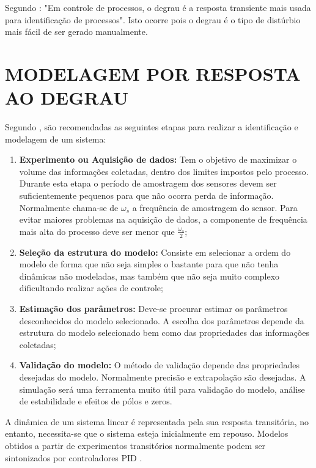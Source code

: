 \documentclass[12pt,oneside,a4paper, chapter=TITLE, section = TITLE, english, brazil]{abntex2}
\begin{document}
Segundo : "Em controle de processos, o degrau  é a resposta transiente mais usada para identificação de processos". Isto ocorre pois o degrau é o tipo de distúrbio mais fácil de ser gerado manualmente.

\section{MODELAGEM POR RESPOSTA AO DEGRAU} \label{sec:mod_degrau} %

Segundo , são recomendadas as seguintes etapas para realizar a identificação e modelagem de um sistema:

\begin{enumerate}

\item \textbf{Experimento ou Aquisição de dados:} Tem o objetivo de maximizar o volume das informações coletadas, dentro dos limites impostos pelo processo. Durante esta etapa o período de amostragem dos sensores devem ser suficientemente pequenos para que não ocorra perda de informação. Normalmente chama-se de $\omega_{s}$ a frequência de amostragem do sensor. Para evitar maiores problemas na aquisição de dados, a componente de frequência mais alta do processo deve ser menor que $\frac{\omega_{s}}{2}$;

\item \textbf{Seleção da estrutura do modelo:} Consiste em selecionar a ordem do modelo de forma que não seja simples o bastante para que não tenha dinâmicas não modeladas, mas também que não seja muito complexo dificultando realizar ações de controle;

\item \textbf{Estimação dos parâmetros:} Deve-se procurar estimar os parâmetros desconhecidos do modelo selecionado. A escolha dos parâmetros depende da estrutura do modelo selecionado bem como das propriedades das informações coletadas;

\item \textbf{Validação do modelo:} O método de validação depende das propriedades desejadas do modelo. Normalmente precisão e extrapolação são desejadas. A simulação será uma ferramenta muito útil para validação do modelo, análise de estabilidade e efeitos de pólos e zeros.

\end{enumerate}

A dinâmica de um sistema linear é representada pela sua resposta transitória, no entanto, necessita-se que o sistema esteja inicialmente em repouso. Modelos obtidos a partir de experimentos transitórios normalmente podem ser sintonizados por controladores PID \cite{astrom}.
\end{document}
